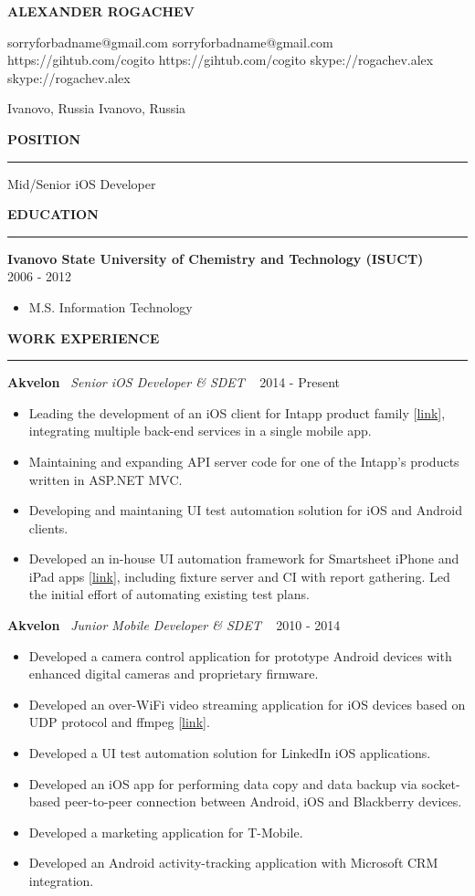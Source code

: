 ﻿\documentclass{article}
\newcommand*{\applicant}[1]{\gdef\applicanttext{#1}}
\newcommand*{\github}[1]{\gdef\githubtext{#1}}
\newcommand*{\email}[1]{\gdef\emailtext{#1}}
\newcommand*{\skype}[1]{\gdef\skypetext{#1}}
\newcommand*{\location}[1]{\gdef\locationtext{#1}}
\renewcommand\maketitle{
  {\setstretch{1.2}
    \centerline{
       \textbf{\huge{\expandafter\MakeUppercase\expandafter{\applicanttext}}}
    }
    \begin{center}
      \ifdefined\emailtext
        \faEnvelopeO \hspace{0.1cm} \emailtext \hspace{0.1cm}
      \fi
      \ifdefined\githubtext
        \faGithub \hspace{0.1cm} \githubtext \hspace{0.1cm}
      \fi
      \ifdefined\skypetext
        \faSkype \hspace{0.1cm} \skypetext \hspace{0.1cm}

      \fi
      \ifdefined\linkedintext
        \faLinkedin \hspace{0.1cm} \linkedintext

      \fi
    \end{center}

    \begin{center}
      \ifdefined\locationtext
        \faHome \hspace{0.1cm} \locationtext
      \fi
    \end{center}
  }
}
\newcommand{\cvsection}[1]{
  \vspace{2.6ex}
  \noindent\textbf{\large{\uppercase{#1}}}
  \vspace{1ex}
  \hrule
  \vspace{1.5ex}
}
\newcommand{\cvparagraph}[3]{
  \noindent\indent
  \textbf{#1}
  \ 
  \textit{#2}
  \ 
  \hfill{}
  {#3}\vspace{1ex}}
\newcommand{\cvlist}[1]{
  \begin{itemize}[topsep=0ex,leftmargin=*,itemsep=0ex,parsep=1ex,labelwidth=\parindent]
    #1
  \end{itemize}
}
\begin{document}
\pagestyle{fancy}
\fancyhf{}
\renewcommand{\headrulewidth}{0pt}
\cfoot{ \the\year\ --\ \LaTeX }

\applicant{Alexander Rogachev}
\github{https://gihtub.com/cogito}
\email{sorryforbadname@gmail.com}
\skype{skype://rogachev.alex}
\location{Ivanovo, Russia}

\maketitle

\cvsection{Position}
Mid/Senior iOS Developer

\cvsection{Education}
\cvparagraph{Ivanovo State University of Chemistry and Technology (ISUCT)}{}{2006 - 2012}
\begin{itemize}[topsep=0ex,leftmargin=*]
  \item M.S. Information Technology
\end{itemize}

\cvsection{Work Experience}

\cvparagraph{Akvelon}{Senior iOS Developer \& SDET}{2014 - Present}
\cvlist{
  \item Leading the development of an iOS client for Intapp product family [\href{https://itunes.apple.com/us/app/intapp/id1052877767}{link}], integrating multiple back-end services in a single mobile app.
  \item Maintaining and expanding API server code for one of the Intapp's products written in ASP.NET MVC.
  \item Developing and maintaning UI test automation solution for iOS and Android clients.
  \item Developed an in-house UI automation framework for Smartsheet iPhone and iPad apps [\href{https://itunes.apple.com/us/app/smartsheet/id568421135}{link}], including fixture server and CI with report gathering. Led the initial effort of automating existing test plans.
}
\vspace{1ex}

\cvparagraph{Akvelon}{Junior Mobile Developer \& SDET}{2010 - 2014}
\cvlist{
  \item Developed a camera control application for prototype Android devices with enhanced digital cameras and proprietary firmware.
  \item Developed an over-WiFi video streaming application for iOS devices based on UDP protocol and ffmpeg [\href{http://neuronbeta.com/chirpglobal/chirpvision/app/}{link}].
  \item Developed a UI test automation solution for LinkedIn iOS applications.
  \item Developed an iOS app for performing data copy and data backup via socket-based peer-to-peer connection between Android, iOS and Blackberry devices.
  \item Developed a marketing application for T-Mobile.
  \item Developed an Android activity-tracking application with Microsoft CRM integration.
}
\end{document}
